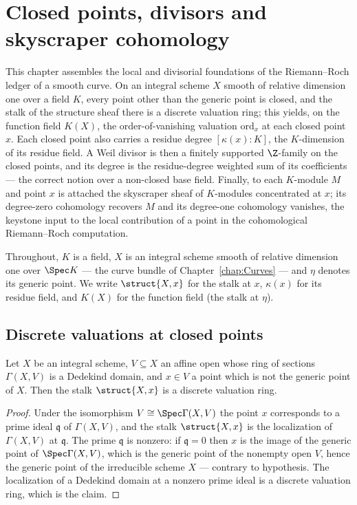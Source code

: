 \chapter{Closed points, divisors and skyscraper cohomology}
\label{chap:RiemannRoch}

This chapter assembles the local and divisorial foundations of the Riemann--Roch ledger of a
smooth curve. On an integral scheme \(X\) smooth of relative dimension one over a field \(K\),
every point other than the generic point is closed, and the stalk of the structure sheaf there
is a discrete valuation ring; this yields, on the function field \(K(X)\), the order-of-vanishing
valuation \(\mathrm{ord}_x\) at each closed point \(x\). Each closed point also carries a residue
degree \([\kappa(x) : K]\), the \(K\)-dimension of its residue field. A Weil divisor is then a
finitely supported \(\Z\)-family on the closed points, and its degree is the residue-degree
weighted sum of its coefficients --- the correct notion over a non-closed base field. Finally, to
each \(K\)-module \(M\) and point \(x\) is attached the skyscraper sheaf of \(K\)-modules
concentrated at \(x\); its degree-zero cohomology recovers \(M\) and its degree-one cohomology
vanishes, the keystone input to the local contribution of a point in the cohomological
Riemann--Roch computation.

Throughout, \(K\) is a field, \(X\) is an integral scheme smooth of relative dimension one over
\(\Spec K\) --- the curve bundle of Chapter~\ref{chap:Curves} --- and \(\eta\) denotes its generic
point. We write \(\struct{X,x}\) for the stalk at \(x\), \(\kappa(x)\) for its residue field,
and \(K(X)\) for the function field (the stalk at \(\eta\)).

\section{Discrete valuations at closed points}

\begin{theorem}
  \label{thm:affine_dedekind_dvr_stalk}
  \leanok
  Let \(X\) be an integral scheme, \(V \subseteq X\) an affine open whose ring of sections
  \(\Gamma(X, V)\) is a Dedekind domain, and \(x \in V\) a point which is not the generic point
  of \(X\). Then the stalk \(\struct{X,x}\) is a discrete valuation ring.
\end{theorem}
\begin{proof}
  \leanok
  Under the isomorphism \(V \cong \Spec \Gamma(X, V)\) the point \(x\) corresponds to a prime
  ideal \(\mathfrak q\) of \(\Gamma(X, V)\), and the stalk \(\struct{X,x}\) is the localization
  of \(\Gamma(X, V)\) at \(\mathfrak q\). The prime \(\mathfrak q\) is nonzero: if
  \(\mathfrak q = 0\) then \(x\) is the image of the generic point of \(\Spec \Gamma(X, V)\),
  which is the generic point of the nonempty open \(V\), hence the generic point of the
  irreducible scheme \(X\) --- contrary to hypothesis. The localization of a Dedekind domain at
  a nonzero prime ideal is a discrete valuation ring, which is the claim.
\end{proof}

